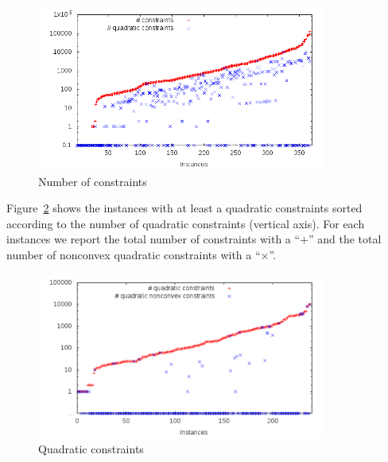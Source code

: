 \begin{figure}\centering
  \includegraphics[width=0.85\textwidth]{pic_constr.png}
  \caption{Number of constraints \label{fig:pic_constr}}
\end{figure}

%
%

Figure~\ref{fig:pic_conv_constr} shows the instances with at least a quadratic constraints sorted according to the number of quadratic constraints (vertical axis). For each instances we report the total number of constraints with a ``$+$''
and the total number of nonconvex quadratic constraints
with a ``$\times$''.

\begin{figure}\centering
  \includegraphics[width=0.85\textwidth]{pic_quad_conv_vs_nonconv.png}
  \caption{Quadratic constraints \label{fig:pic_conv_constr}}
\end{figure}





